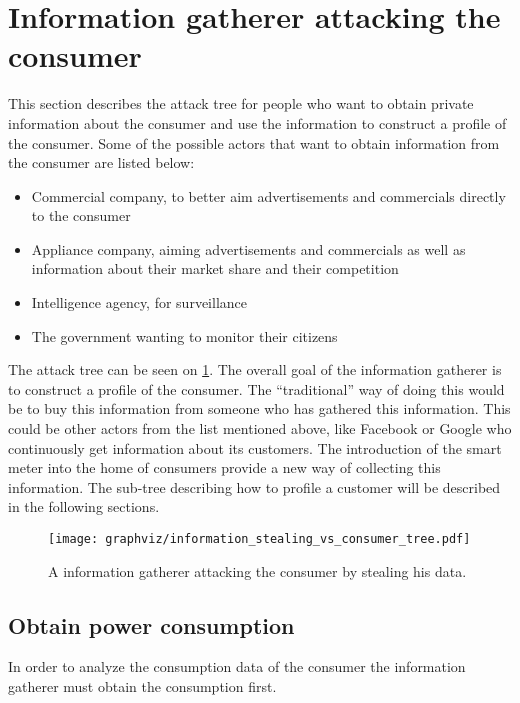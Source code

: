 \section{Information gatherer attacking the consumer}\label{informationGathererVsConsumer}
This section describes the attack tree for people who want to obtain private information about the consumer and use the information to construct a profile of the consumer.
Some of the possible actors that want to obtain information from the consumer are listed below:
\begin{itemize}
\item Commercial company, to better aim advertisements and commercials directly to the consumer
\item Appliance company, aiming advertisements and commercials as well as information about their market share and their competition
\item Intelligence agency, for surveillance
\item The government wanting to monitor their citizens
\end{itemize}

The attack tree can be seen on \cref{information_stealing_tree}.
The overall goal of the information gatherer is to construct a profile of the consumer.
The ``traditional'' way of doing this would be to buy this information from someone who has gathered this information.
This could be other actors from the list mentioned above, like Facebook or Google who continuously get information about its customers.
The introduction of the smart meter into the home of consumers provide a new way of collecting this information.
The sub-tree describing how to profile a customer will be described in the following sections.


\begin{figure}
  \begin{center}
    \texttt{[image: graphviz/information\_stealing\_vs\_consumer\_tree.pdf]}
  \end{center}
  \caption{A information gatherer attacking the consumer by stealing his data.}
  \label{information_stealing_tree}
\end{figure}

\subsection{Obtain power consumption}
In order to analyze the consumption data of the consumer the information gatherer must obtain the consumption first.

